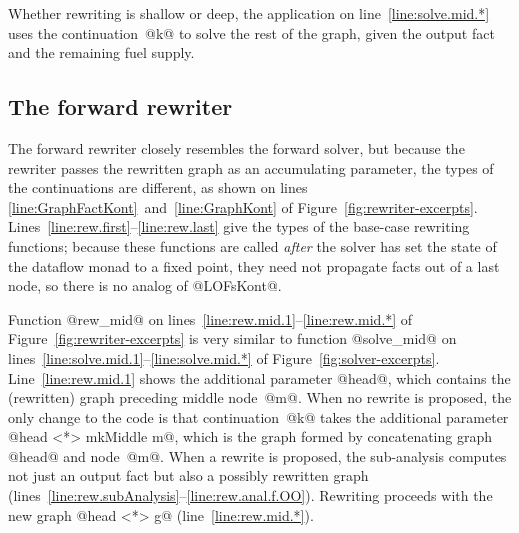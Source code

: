 \documentclass[blockstyle,preprint,natbib,nocopyrightspace]{sigplanconf}
\newcommand\lineref[1]{line~\ref{line:#1}}
\newcommand\linepairref[2]{lines \ref{line:#1}~and~\ref{line:#2}}
\newcommand\linerangeref[2]{\mbox{lines~\ref{line:#1}--\ref{line:#2}}}
\newcommand\Lineref[1]{Line~\ref{line:#1}}
\newcommand\Linerangeref[2]{\mbox{Lines~\ref{line:#1}--\ref{line:#2}}}
\newcommand\seclabel[1]{\label{sec:#1}}
\newcommand\figref[1]{Figure~\ref{fig:#1}}
\begin{document}
Whether rewriting is shallow or deep, the application on
\lineref{solve.mid.*} uses the continuation~@k@ to solve the rest of
the graph, given the output fact and the remaining fuel supply.






\subsection{The forward rewriter}

\seclabel{forward-rewriter}

The forward rewriter closely resembles the
forward solver, but because the rewriter passes the rewritten graph as
an accumulating parameter, the types of the continuations are
different, as shown on \linepairref{GraphFactKont}{GraphKont} of
\figref{rewriter-excerpts}. 
\Linerangeref{rew.first}{rew.last} give the types of the base-case
rewriting functions; because these functions are called \emph{after}
the solver has set the state of the dataflow monad to a fixed
point, they need not propagate facts out of a last node, so there is
no analog of @LOFsKont@.

Function @rew_mid@ on \linerangeref{rew.mid.1}{rew.mid.*} of
\figref{rewriter-excerpts} is very similar to function @solve_mid@ on 
\linerangeref{solve.mid.1}{solve.mid.*} of \figref{solver-excerpts}.
\Lineref{rew.mid.1} shows the additional parameter @head@, which
contains the (rewritten) graph preceding middle node~@m@.
When no rewrite is proposed, the only change to the code is that
continuation~@k@ takes the additional parameter
@head <*> mkMiddle m@,
which is the graph formed by concatenating graph @head@ and node~@m@. 
When a rewrite is proposed, the sub-analysis computes not just an
output fact but also a possibly rewritten graph
(\linerangeref{rew.subAnalysis}{rew.anal.f.OO}).
Rewriting proceeds with the new graph @head <*> g@
(\lineref{rew.mid.*}).
\end{document}
